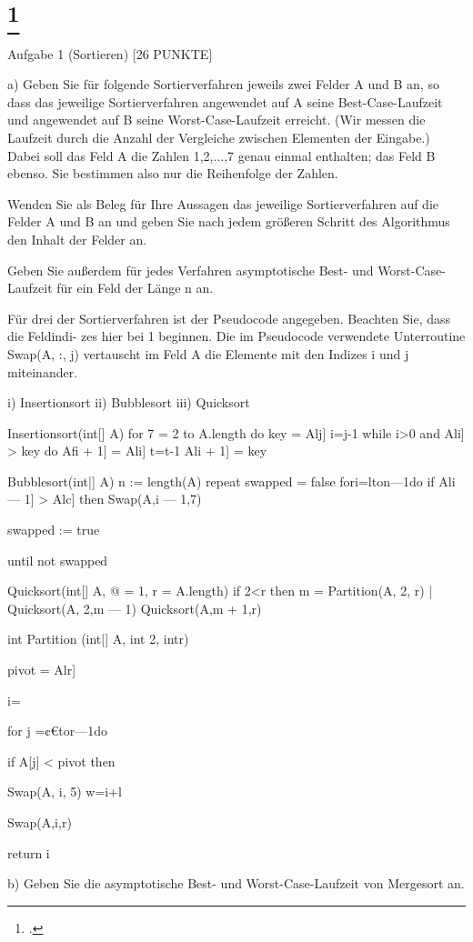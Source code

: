 \documentclass{lehramt-informatik-aufgabe}
\begin{document}
\liAufgabenTitel{}
\section{
\footcite{examen:46115:2021:03}}

Aufgabe 1 (Sortieren) [26 PUNKTE]

a) Geben Sie für folgende Sortierverfahren jeweils zwei Felder A und B an, so dass das jeweilige
Sortierverfahren angewendet auf A seine Best-Case-Laufzeit und angewendet auf B seine
Worst-Case-Laufzeit erreicht. (Wir messen die Laufzeit durch die Anzahl der Vergleiche
zwischen Elementen der Eingabe.) Dabei soll das Feld A die Zahlen 1,2,...,7 genau einmal
enthalten; das Feld B ebenso. Sie bestimmen also nur die Reihenfolge der Zahlen.

Wenden Sie als Beleg für Ihre Aussagen das jeweilige Sortierverfahren auf die Felder A und
B an und geben Sie nach jedem größeren Schritt des Algorithmus den Inhalt der Felder an.

Geben Sie außerdem für jedes Verfahren asymptotische Best- und Worst-Case-Laufzeit für
ein Feld der Länge n an.

Für drei der Sortierverfahren ist der Pseudocode angegeben. Beachten Sie, dass die Feldindi-
zes hier bei 1 beginnen. Die im Pseudocode verwendete Unterroutine Swap(A, :, j) vertauscht
im Feld A die Elemente mit den Indizes i und j miteinander.

i) Insertionsort
ii) Bubblesort
iii) Quicksort

Insertionsort(int[] A)
for 7 = 2 to A.length do
key = Alj]
i=j-1
while i>0 and Ali] > key do
Afi + 1] = Ali]
t=t-1
Ali + 1] = key

Bubblesort(int|] A)
n := length(A)
repeat
swapped = false
fori=lton—1do
if Ali — 1] > Alc] then
Swap(A,i — 1,7)

swapped := true

until not swapped

Quicksort(int[] A, @ = 1, r = A.length)
if 2<r then
m = Partition(A, 2, r)
| Quicksort(A, 2,m — 1)
Quicksort(A,m + 1,r)

int Partition (int|] A, int 2, intr)

pivot = Alr]

i=

for j =¢€tor—1do

if A[j] < pivot then

Swap(A, i, 5)
w=i+l

Swap(A,i,r)

return i

b) Geben Sie die asymptotische Best- und Worst-Case-Laufzeit von Mergesort an.
\end{document}
